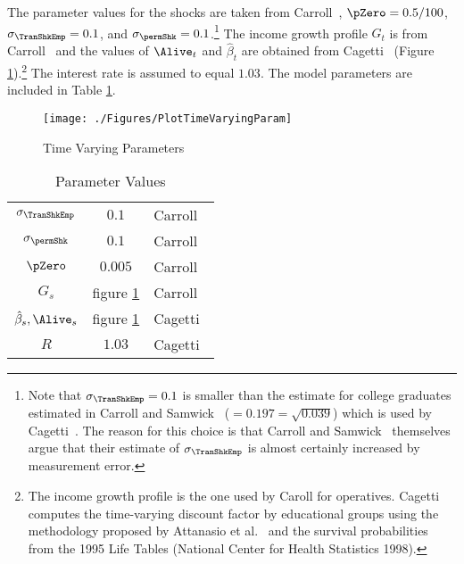 \documentclass[titlepage, headings=optiontotocandhead]{Resources/texmf-local/tex/latex/econtex}
\begin{document}
The parameter values for the shocks are taken from Carroll~\citeyearpar{carroll:brookings}, $\pZero=0.5/100$, $\sigma _{\TranShkEmp }=0.1$, and $\sigma_{\permShk}=0.1$.\footnote{Note that $\sigma _{\TranShkEmp}=0.1$ is smaller than the estimate for college graduates estimated in
  Carroll and Samwick~\citeyearpar{carroll&samwick:nature} ($=0.197=\sqrt{0.039}$) which is used by Cagetti~\citeyearpar{cagettiWprofiles}. The reason for this choice is that Carroll and Samwick~\citeyearpar{carroll&samwick:nature} themselves argue that their estimate of $\sigma_{\TranShkEmp }$ is almost certainly increased by measurement error.} The income growth profile $G_{t}$ is from Carroll~\citeyearpar{carrollBSLCPIH} and the values of $\Alive_{t}$ and $\hat{\beta}_{t}$ are obtained from Cagetti~\citeyearpar{cagettiWprofiles} (Figure \ref{fig:TimeVaryingParam}).\footnote{The income growth profile is the one used by Caroll for operatives. Cagetti computes the time-varying discount factor by educational groups using the methodology proposed by Attanasio et al.~\citeyearpar{AttanasioBanksMeghirWeber} and the survival probabilities from the 1995 Life Tables (National Center for Health Statistics 1998).} The interest rate is assumed to equal $1.03$. The model parameters are included in Table \ref{table:StrEstParams}.

\hypertarget{PlotTimeVaryingParam}{}
\begin{figure}[h]
  \texttt{[image: ./Figures/PlotTimeVaryingParam]}
  \caption{Time Varying Parameters}
  \label{fig:TimeVaryingParam}
\end{figure}

\begin{table}[h]
  \caption{Parameter Values}\label{table:StrEstParams}
  \begin{center}
    \begin{tabular}{ccl}
      \hline\hline
      $\sigma _{\TranShkEmp}$    & $0.1$ & Carroll~\citeyearpar{carroll:brookings}
      \\ $\sigma _{\permShk}$   & $0.1$ & Carroll~\citeyearpar{carroll:brookings}
      \\ $\pZero$           & $0.005$  & Carroll~\citeyearpar{carroll:brookings}
      \\ $G_{s}$        & figure \ref{fig:TimeVaryingParam} & Carroll~\citeyearpar{carrollBSLCPIH}
      \\ $\hat{\beta}_{s},\Alive_{s}$ & figure \ref{fig:TimeVaryingParam} & Cagetti~\citeyearpar{cagettiWprofiles}
      \\$R$            & $1.03$  & Cagetti~\citeyearpar{cagettiWprofiles}\\
      \hline
    \end{tabular}
  \end{center}
\end{table}
\end{document}
